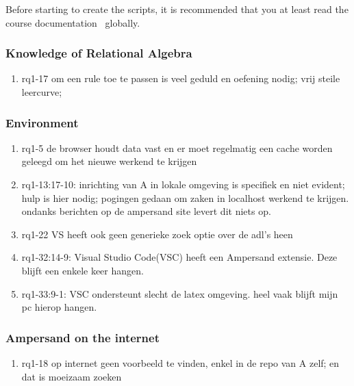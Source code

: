 Before starting to create the scripts, it is recommended that you at least read the course documentation~ globally.



\subsubsection{Knowledge of Relational Algebra}
\begin{comment}
plaats hier de afgehandelde items.
\end{comment}

\begin{enumerate}
    \item rq1-17 om een rule toe te passen is veel geduld en oefening nodig; vrij steile leercurve; 
\end{enumerate}

\subsubsection{Environment}
\begin{comment}
plaats hier de afgehandelde items.
\end{comment}
\begin{enumerate}
    \item rq1-5 de browser houdt data vast en er moet regelmatig een cache worden geleegd om het nieuwe werkend te krijgen
    \item rq1-13:17-10: inrichting van A in lokale omgeving is specifiek en niet evident; hulp is hier nodig; pogingen gedaan om zaken in localhost werkend te krijgen. ondanks berichten op de ampersand site levert dit niets op.
    \item rq1-22 VS heeft ook geen generieke zoek optie over de adl's heen
    \item rq1-32:14-9: Visual Studio Code(VSC) heeft een Ampersand extensie. Deze blijft een enkele keer hangen.
    \item rq1-33:9-1: VSC ondersteunt slecht de latex omgeving. heel vaak blijft mijn pc hierop hangen.  

\end{enumerate}

\subsubsection{Ampersand on the internet}
\begin{comment}
plaats hier de afgehandelde items.
\end{comment}
\begin{enumerate}
    \item rq1-18 op internet geen voorbeeld te vinden, enkel in de repo van A zelf; en dat is moeizaam zoeken    
\end{enumerate}

